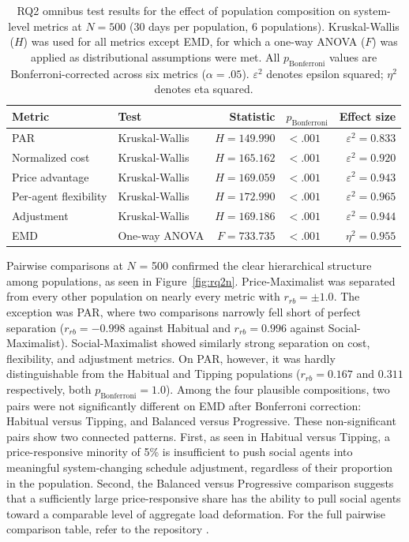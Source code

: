 \documentclass[11pt, a4paper]{article}
\begin{document}
\begin{table}
    \caption{RQ2 omnibus test results for the effect of population composition on system-level metrics at $N = 500$ (30 days per population, 6 populations).
    Kruskal-Wallis ($H$) was used for all metrics except EMD, for which a one-way ANOVA ($F$) was applied as distributional assumptions were met.
    All $p_{\text{Bonferroni}}$ values are Bonferroni-corrected across six metrics ($\alpha = .05$).
    $\varepsilon^2$ denotes epsilon squared; $\eta^2$ denotes eta squared.}
    \label{tab:rq2_omnibus}
    \centering
    \small
    \begin{tabular}{l l r l r}
        \toprule
        Metric & Test & Statistic & $p_{\text{Bonferroni}}$ & Effect size \\
        \midrule
        PAR                   & Kruskal-Wallis & $H = 149.990$ & $< .001$ & $\varepsilon^2 = 0.833$ \\
        Normalized cost       & Kruskal-Wallis & $H = 165.162$ & $< .001$ & $\varepsilon^2 = 0.920$ \\
        Price advantage       & Kruskal-Wallis & $H = 169.059$ & $< .001$ & $\varepsilon^2 = 0.943$ \\
        Per-agent flexibility & Kruskal-Wallis & $H = 172.990$ & $< .001$ & $\varepsilon^2 = 0.965$ \\
        Adjustment            & Kruskal-Wallis & $H = 169.186$ & $< .001$ & $\varepsilon^2 = 0.944$ \\
        EMD                   & One-way ANOVA  & $F = 733.735$ & $< .001$ & $\eta^2 = 0.955$ \\
        \bottomrule
    \end{tabular}
\end{table}

\pagebreak
Pairwise comparisons at $N$ = 500 confirmed the clear hierarchical structure among populations, as seen in Figure~\ref{fig:rq2n}. Price-Maximalist was separated from every other population on nearly every metric with $r_{rb} = \pm 1.0$. The exception was PAR, where two comparisons narrowly fell short of perfect separation ($r_{rb} = -0.998$ against Habitual and $r_{rb} = 0.996$ against Social-Maximalist). Social-Maximalist showed similarly strong separation on cost, flexibility, and adjustment metrics. On PAR, however, it was hardly distinguishable from the Habitual and Tipping populations ($r_{rb} = 0.167$ and $0.311$ respectively, both $p_{\text{Bonferroni}} = 1.0$). Among the four plausible compositions, two pairs were not significantly different on EMD after Bonferroni correction: Habitual versus Tipping, and Balanced versus Progressive. These non-significant pairs show two connected patterns. First, as seen in Habitual versus Tipping, a price-responsive minority of 5\% is insufficient to push social agents into meaningful system-changing schedule adjustment, regardless of their proportion in the population. Second, the Balanced versus Progressive comparison suggests that a sufficiently large price-responsive share has the ability to pull social agents toward a comparable level of aggregate load deformation. For the full pairwise comparison table, refer to the repository \autocite{geschiere_electricity_thesis_andrey_geschiere_csai_2026}.
\end{document}
